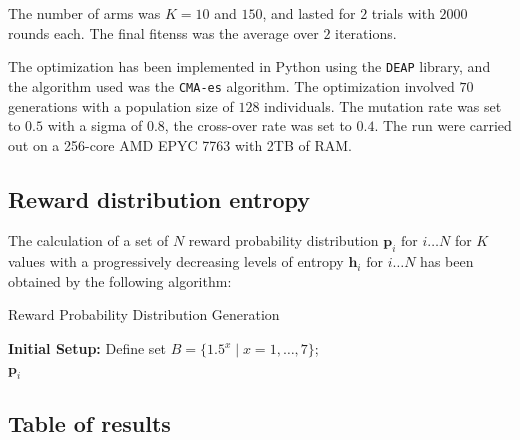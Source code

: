 \noindent The number of arms was $K=10$ and $150$, and lasted for $2$ trials with $2000$ rounds each.
The final fitenss was the average over $2$ iterations.

\hfill \break
The optimization has been implemented in Python using the \texttt{DEAP} library, and the algorithm used was the \texttt{CMA-es} algorithm. The optimization involved $70$ generations with a population size of $128$ individuals. The mutation rate was set to $0.5$ with a sigma of $0.8$, the cross-over rate was set to $0.4$.
The run were carried out on a 256-core AMD EPYC 7763 with 2TB of RAM.


\subsection{Reward distribution entropy}\label{sec:appendix_entropy}

\noindent The calculation of a set of $N$ reward probability distribution $\mathbf{p}_{i}\text{  for  } i\ldots N$ for $K$ values with a progressively decreasing levels of entropy $\mathbf{h}_{i}\text{  for  } i\ldots N$ has been obtained by the following algorithm:

\begin{algorithm}[ht]
\caption{Reward Probability Distribution Generation}
\label{alg:reward_distribution}
\SetAlgoLined
{}
\textbf{Initial Setup:}
Define set $B = \{1.5^x \mid x = 1, \ldots, 7\}$; \\
\Return ${\mathbf{p}_i}$
\end{algorithm}


\subsection{Table of results}

